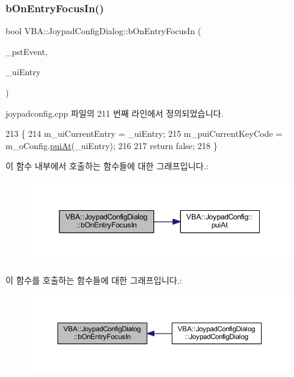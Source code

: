\subsubsection{\texorpdfstring{b\+On\+Entry\+Focus\+In()}{bOnEntryFocusIn()}}
{\footnotesize\ttfamily bool V\+B\+A\+::\+Joypad\+Config\+Dialog\+::b\+On\+Entry\+Focus\+In (\begin{DoxyParamCaption}\item[{Gdk\+Event\+Focus $\ast$}]{\+\_\+pst\+Event,  }\item[{guint}]{\+\_\+ui\+Entry }\end{DoxyParamCaption})\hspace{0.3cm}{\ttfamily [protected]}}



joypadconfig.\+cpp 파일의 211 번째 라인에서 정의되었습니다.


\begin{DoxyCode}
213 \{
214   m\_uiCurrentEntry    = \_uiEntry;
215   m\_puiCurrentKeyCode = m\_oConfig.\mbox{\hyperlink{class_v_b_a_1_1_joypad_config_afa304227fa214176c874619365ffc445}{puiAt}}(\_uiEntry);
216 
217   \textcolor{keywordflow}{return} \textcolor{keyword}{false};
218 \}
\end{DoxyCode}
이 함수 내부에서 호출하는 함수들에 대한 그래프입니다.\+:
\nopagebreak
\begin{figure}[H]
\begin{center}
\leavevmode
\includegraphics[width=350pt]{class_v_b_a_1_1_joypad_config_dialog_a8be1420a4a3feee2e71bde31a2d7932d_cgraph}
\end{center}
\end{figure}
이 함수를 호출하는 함수들에 대한 그래프입니다.\+:
\nopagebreak
\begin{figure}[H]
\begin{center}
\leavevmode
\includegraphics[width=350pt]{class_v_b_a_1_1_joypad_config_dialog_a8be1420a4a3feee2e71bde31a2d7932d_icgraph}
\end{center}
\end{figure}
\mbox{\label{class_v_b_a_1_1_joypad_config_dialog_a1e8f4908a9d7c4f027d4eeee8848a984}} 
